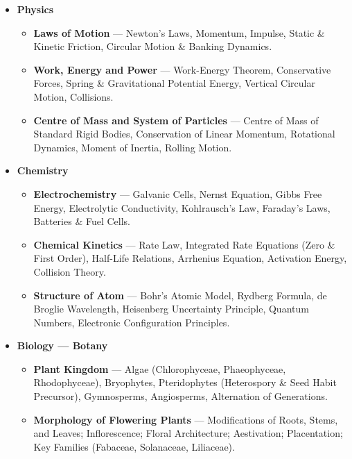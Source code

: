 \documentclass[11pt,a4paper]{article}
\begin{document}
\begin{tcolorbox}[enhanced,colback=white,colframe=primaryteal,arc=2mm,boxrule=1pt]
\begin{itemize}[leftmargin=1.5em, itemsep=3pt]
  \item \textbf{\color{primaryteal}Physics}
  \begin{itemize}[label=$\circ$, itemsep=1pt]
    \item \textbf{Laws of Motion} --- Newton's Laws, Momentum, Impulse, Static \& Kinetic Friction, Circular Motion \& Banking Dynamics.
    \item \textbf{Work, Energy and Power} --- Work-Energy Theorem, Conservative Forces, Spring \& Gravitational Potential Energy, Vertical Circular Motion, Collisions.
    \item \textbf{Centre of Mass and System of Particles} --- Centre of Mass of Standard Rigid Bodies, Conservation of Linear Momentum, Rotational Dynamics, Moment of Inertia, Rolling Motion.
  \end{itemize}

  \item \textbf{\color{primaryteal}Chemistry}
  \begin{itemize}[label=$\circ$, itemsep=1pt]
    \item \textbf{Electrochemistry} --- Galvanic Cells, Nernst Equation, Gibbs Free Energy, Electrolytic Conductivity, Kohlrausch's Law, Faraday's Laws, Batteries \& Fuel Cells.
    \item \textbf{Chemical Kinetics} --- Rate Law, Integrated Rate Equations (Zero \& First Order), Half-Life Relations, Arrhenius Equation, Activation Energy, Collision Theory.
    \item \textbf{Structure of Atom} --- Bohr's Atomic Model, Rydberg Formula, de Broglie Wavelength, Heisenberg Uncertainty Principle, Quantum Numbers, Electronic Configuration Principles.
  \end{itemize}

  \item \textbf{\color{primaryteal}Biology --- Botany}
  \begin{itemize}[label=$\circ$, itemsep=1pt]
    \item \textbf{Plant Kingdom} --- Algae (Chlorophyceae, Phaeophyceae, Rhodophyceae), Bryophytes, Pteridophytes (Heterospory \& Seed Habit Precursor), Gymnosperms, Angiosperms, Alternation of Generations.
    \item \textbf{Morphology of Flowering Plants} --- Modifications of Roots, Stems, and Leaves; Inflorescence; Floral Architecture; Aestivation; Placentation; Key Families (Fabaceae, Solanaceae, Liliaceae).
  \end{itemize}


\end{itemize}
\end{tcolorbox}
\end{document}
